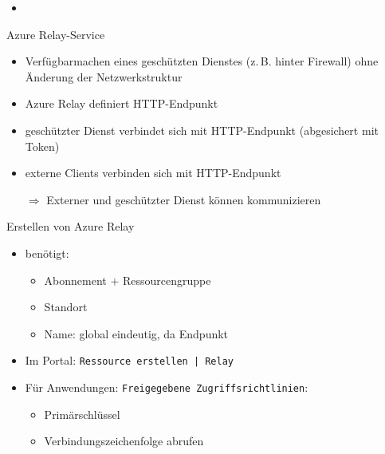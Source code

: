 \begin{flashcard}[Definition]{}
    \begin{itemize}
        \item
    \end{itemize}
\end{flashcard}

\begin{flashcard}[Definition]{Azure Relay-Service}
    \begin{itemize}
        \item Verfügbarmachen eines geschützten Dienstes (z.\,B. hinter Firewall) ohne Änderung der Netzwerkstruktur
        \item Azure Relay definiert HTTP-Endpunkt
        \item geschützter Dienst verbindet sich mit HTTP-Endpunkt (abgesichert mit Token)
        \item externe Clients verbinden sich mit HTTP-Endpunkt
        \item[$\Rightarrow$] Externer und geschützter Dienst können kommunizieren
    \end{itemize}
\end{flashcard}

\begin{flashcard}[Definition]{Erstellen von Azure Relay}
    \begin{itemize}
        \item benötigt:
            \begin{itemize}
                \item Abonnement + Ressourcengruppe
                \item Standort
                \item Name: global eindeutig, da Endpunkt
            \end{itemize}
        \item Im Portal: \texttt{Ressource erstellen | Relay}
        \item Für Anwendungen: \texttt{Freigegebene Zugriffsrichtlinien}:
        \begin{itemize}
            \item Primärschlüssel
            \item Verbindungszeichenfolge abrufen
        \end{itemize}
    \end{itemize}
\end{flashcard}

